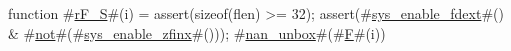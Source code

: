 function #\hyperref[sailRISCVzrFzyS]{rF\_S}#(i) = {
  assert(sizeof(flen) >= 32);
  assert(#\hyperref[sailRISCVzsyszyenablezyfdext]{sys\_enable\_fdext}#() & #\hyperref[sailRISCVznot]{not}#(#\hyperref[sailRISCVzsyszyenablezyzzfinx]{sys\_enable\_zfinx}#()));
  #\hyperref[sailRISCVznanzyunbox]{nan\_unbox}#(#\hyperref[sailRISCVzF]{F}#(i))
}
